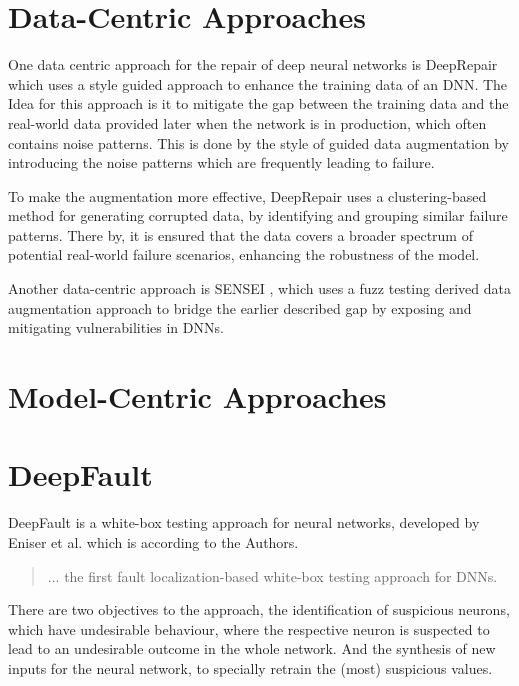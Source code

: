 \section{Data-Centric Approaches}\label{sec:data-centric-approaches}
One data centric approach for the repair of deep neural networks is DeepRepair \cite{yu_deeprepair_2022} which uses a style guided approach to enhance the training data of an DNN. The Idea for this approach is it to mitigate the gap between the training data and the real-world data provided later when the network is in production, which often contains noise patterns.
This is done by the style of guided data augmentation by introducing the noise patterns which are frequently leading to failure.

To make the augmentation more effective, DeepRepair uses a clustering-based method for generating corrupted data, by identifying and grouping similar failure patterns.
There by, it is ensured that the data covers a broader spectrum of potential real-world failure scenarios, enhancing the robustness of the model.

Another data-centric approach is SENSEI \cite{gao_fuzz_2020}, which uses a fuzz testing derived data augmentation approach to bridge the earlier described gap by exposing and mitigating vulnerabilities in DNNs.

\section{Model-Centric Approaches}\label{sec:model-centric-approaches}


\section{DeepFault}\label{sec:deepfault}
DeepFault\cite{eniser_deepfault_2019} is a white-box testing approach for neural networks, developed by Eniser et al. which is according to the Authors.
\begin{quote}
    ... the first fault localization-based white-box testing approach for DNNs.
\end{quote}
There are two objectives to the approach, the identification of suspicious neurons, which have undesirable behaviour, where the respective neuron is suspected to lead to an undesirable outcome in the whole network.
And the synthesis of new inputs for the neural network, to specially retrain the (most) suspicious values.

